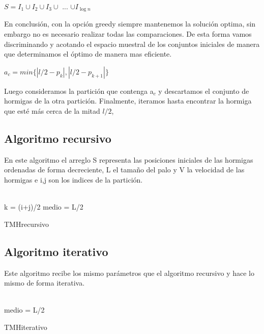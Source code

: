 \documentclass[11pt,spanish]{article}
\begin{document}
\begin{center}$S = I_1 \cup I_2 \cup I_3 \cup$ ... $\cup I_{\log{n}}$\end{center}
En conclusión, con la opción greedy siempre mantenemos la solución optima, sin embargo no es necesario realizar todas las comparaciones. De esta forma vamos discriminando y acotando el espacio muestral de los conjuntos iniciales de manera que determinamos el óptimo de manera mas eficiente.

\begin{center} $a_{c} = min\{|l/2-p_k|,|l/2-p_{k+1}|\}$\end{center}
Luego consideramos la partición que contenga a$_{c}$ y descartamos el conjunto de hormigas de la otra partición. Finalmente, iteramos hasta encontrar la hormiga que esté más cerca de la mitad $l/2$,

\subsection{Algoritmo recursivo}
En este algoritmo el arreglo S representa las posiciones iniciales de las hormigas ordenadas de forma decreciente, L el tamaño del palo y V la velocidad de las hormigas e i,j son los indices de la partición.\\\\
\begin{algorithm}[H]
 k = (i+j)/2\;
 medio = L/2\;
 \caption{TMHrecursivo}
 \label{fig:algo1}
\end{algorithm}
\subsection{Algoritmo iterativo}
Este algoritmo recibe los mismo parámetros que el algoritmo recursivo y hace lo mismo de forma iterativa.\\\\
\begin{algorithm}[H]
 medio = L/2\;
 \caption{TMHiterativo}
 \label{fig:algo2}
\end{algorithm}
\newpage
\end{document}
